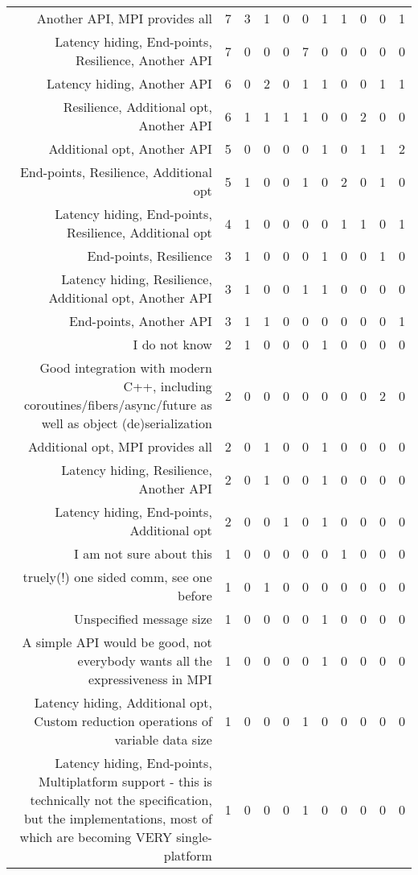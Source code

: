 {\begin{landscape}
\begin{longtable}[htb]{r|c|c|c|c|c|c|c|c|c|c}
{Another API, MPI provides all} & 7 & 3 & 1 & 0 & 0 & 1 & 1 & 0 & 0 & 1 \\%
{Latency hiding, End-points, Resilience, Another API} & 7 & 0 & 0 & 0 & 7 & 0 & 0 & 0 & 0 & 0 \\%
{Latency hiding, Another API} & 6 & 0 & 2 & 0 & 1 & 1 & 0 & 0 & 1 & 1 \\%
{Resilience, Additional opt, Another API} & 6 & 1 & 1 & 1 & 1 & 0 & 0 & 2 & 0 & 0 \\%
{Additional opt, Another API} & 5 & 0 & 0 & 0 & 0 & 1 & 0 & 1 & 1 & 2 \\%
{End-points, Resilience, Additional opt} & 5 & 1 & 0 & 0 & 1 & 0 & 2 & 0 & 1 & 0 \\%
{Latency hiding, End-points, Resilience, Additional opt} & 4 & 1 & 0 & 0 & 0 & 0 & 1 & 1 & 0 & 1 \\%
{End-points, Resilience} & 3 & 1 & 0 & 0 & 0 & 1 & 0 & 0 & 1 & 0 \\%
{Latency hiding, Resilience, Additional opt, Another API} & 3 & 1 & 0 & 0 & 1 & 1 & 0 & 0 & 0 & 0 \\%
{End-points, Another API} & 3 & 1 & 1 & 0 & 0 & 0 & 0 & 0 & 0 & 1 \\%
{I do not know} & 2 & 1 & 0 & 0 & 0 & 1 & 0 & 0 & 0 & 0 \\%
{Good integration with modern C++, including coroutines/fibers/async/future as well as object (de)serialization} & 2 & 0 & 0 & 0 & 0 & 0 & 0 & 0 & 2 & 0 \\%
{Additional opt, MPI provides all} & 2 & 0 & 1 & 0 & 0 & 1 & 0 & 0 & 0 & 0 \\%
{Latency hiding, Resilience, Another API} & 2 & 0 & 1 & 0 & 0 & 1 & 0 & 0 & 0 & 0 \\%
{Latency hiding, End-points, Additional opt} & 2 & 0 & 0 & 1 & 0 & 1 & 0 & 0 & 0 & 0 \\%
{I am not sure about this} & 1 & 0 & 0 & 0 & 0 & 0 & 1 & 0 & 0 & 0 \\%
{truely(!) one sided comm, see one before} & 1 & 0 & 1 & 0 & 0 & 0 & 0 & 0 & 0 & 0 \\%
{Unspecified message size} & 1 & 0 & 0 & 0 & 0 & 1 & 0 & 0 & 0 & 0 \\%
{A simple API would be good, not everybody wants all the expressiveness in MPI} & 1 & 0 & 0 & 0 & 0 & 1 & 0 & 0 & 0 & 0 \\%
{Latency hiding, Additional opt, Custom reduction operations of variable data size} & 1 & 0 & 0 & 0 & 1 & 0 & 0 & 0 & 0 & 0 \\%
{Latency hiding, End-points, Multiplatform support - this is technically not the specification, but the implementations, most of which are becoming VERY single-platform} & 1 & 0 & 0 & 0 & 1 & 0 & 0 & 0 & 0 & 0 \\%

\end{longtable}
\end{landscape}}
